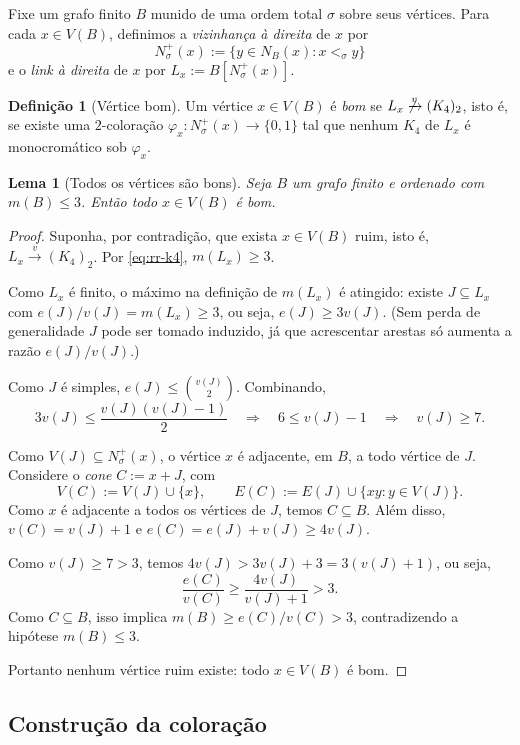 \documentclass[reqno, 12pt]{amsart}
\numberwithin{equation}{section}
\theoremstyle{plain}
\newtheorem{lemma}[theorem]{Lema}
\theoremstyle{definition}
\newtheorem{definition}[theorem]{Definição}
\begin{document}
Fixe um grafo finito $B$ munido de uma ordem total $\sigma$ sobre seus
vértices. Para cada $x\in V(B)$, definimos a \emph{vizinhança à
  direita} de $x$ por
\[
  N_\sigma^+(x):=\{y\in N_B(x): x<_\sigma y\}
\]
e o \emph{link à direita} de $x$ por $L_x:=B[N_\sigma^+(x)]$.

\begin{definition}[Vértice bom]
  \label{def:bom}
  Um vértice $x\in V(B)$ é \emph{bom} se $L_x\not\xrightarrow{v}(K_4)_2$,
  isto é, se existe uma $2$-coloração
  $\varphi_x:N_\sigma^+(x)\to\{0,1\}$ tal que nenhum $K_4$ de $L_x$ é
  monocromático sob $\varphi_x$.
\end{definition}

\begin{lemma}[Todos os vértices são bons]
  \label{lem:todos-bons}
  Seja $B$ um grafo finito e ordenado com $m(B)\leq 3$. Então todo
  $x\in V(B)$ é bom.
\end{lemma}

\begin{proof}
  Suponha, por contradição, que exista $x\in V(B)$ ruim, isto é,
  $L_x\xrightarrow{v}(K_4)_2$. Por \eqref{eq:rr-k4}, $m(L_x)\geq 3$.

  Como $L_x$ é finito, o máximo na definição de $m(L_x)$ é atingido:
  existe $J\subseteq L_x$ com $e(J)/v(J)=m(L_x)\geq 3$, ou seja,
  $e(J)\geq 3v(J)$. (Sem perda de generalidade $J$ pode ser tomado
  induzido, já que acrescentar arestas só aumenta a razão
  $e(J)/v(J)$.)

  Como $J$ é simples, $e(J)\leq\binom{v(J)}{2}$. Combinando,
  \[
    3v(J)\leq\frac{v(J)(v(J)-1)}{2}
    \quad\Longrightarrow\quad
    6\leq v(J)-1
    \quad\Longrightarrow\quad
    v(J)\geq 7.
  \]

  Como $V(J)\subseteq N_\sigma^+(x)$, o vértice $x$ é adjacente, em
  $B$, a todo vértice de $J$. Considere o \emph{cone} $C:=x+J$, com
  \[
    V(C):=V(J)\cup\{x\},\qquad
    E(C):=E(J)\cup\{xy: y\in V(J)\}.
  \]
  Como $x$ é adjacente a todos os vértices de $J$, temos $C\subseteq
    B$. Além disso, $v(C)=v(J)+1$ e $e(C)=e(J)+v(J)\geq 4v(J)$.

  Como $v(J)\geq 7>3$, temos $4v(J)>3v(J)+3=3(v(J)+1)$, ou seja,
  \[
    \frac{e(C)}{v(C)}\geq\frac{4v(J)}{v(J)+1}>3.
  \]
  Como $C\subseteq B$, isso implica $m(B)\geq e(C)/v(C)>3$,
  contradizendo a hipótese $m(B)\leq 3$.

  Portanto nenhum vértice ruim existe: todo $x\in V(B)$ é bom.
\end{proof}

\subsection{Construção da coloração}
\end{document}
